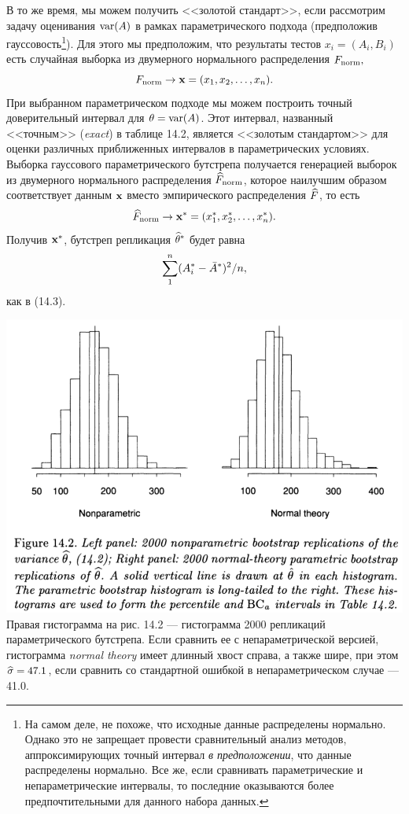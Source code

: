 В то же время, мы можем получить <<золотой стандарт>>, если рассмотрим задачу оценивания $\text{var} (A)$ в рамках параметрического подхода (предположив гауссовость\footnote{На самом деле, не похоже, что исходные данные распределены нормально. Однако это не запрещает провести сравнительный анализ методов, аппроксимирующих точный интервал \textit{в предположении}, что данные распределены нормально. Все же, если сравнивать параметрические и непараметрические интервалы, то последние оказываются более предпочтительными для данного набора данных.}). Для этого мы предположим, что результаты тестов $x_i = (A_i, B_i)$ есть случайная выборка из двумерного нормального распределения $F_{\text{norm}},$
\begin{equation}
  F_{\text{norm}} \rightarrow \mathbf x = (x_1,x_2,\ldots,x_{n}).
\end{equation}
При выбранном параметрическом подходе мы можем построить точный доверительный интервал для $\theta = \text{var} (A)$. %
Этот интервал, названный <<точным>> (\textit{exact}) в таблице 14.2, является <<золотым стандартом>> для оценки различных приближенных интервалов в параметрических условиях.
Выборка гауссового параметрического бутстрепа получается генерацией выборок из двумерного нормального распределения $\widehat{F}_{\text{norm}}$, которое наилучшим образом соответствует данным $\mathbf x$ вместо эмпирического распределения $\widehat{F}$, то есть
\begin{equation}
  \widehat{F}_{\text{norm}} \rightarrow \mathbf x^* = (x_1^*,x_2^*,\ldots,x_{n}^*).
\end{equation}
Получив $\mathbf x^*$, бутстреп репликация $\widehat{\theta}^*$ будет равна 
$$
\sum_{1}^{n} (A_i^* - \bar A^*)^2/n,
$$
как в (14.3). 

\includegraphics[width=0.85\linewidth]{14/f142.png}
\newline
\noindent Правая гистограмма на рис. 14.2 --- гистограмма 2000 репликаций параметрического бутстрепа. Если сравнить ее с непараметрической версией, гистограмма \textit{normal theory} имеет длинный хвост справа, а также шире, при этом $\widehat{\sigma} = 47.1$, если сравнить со стандартной ошибкой в непараметрическом случае --- 41.0.

